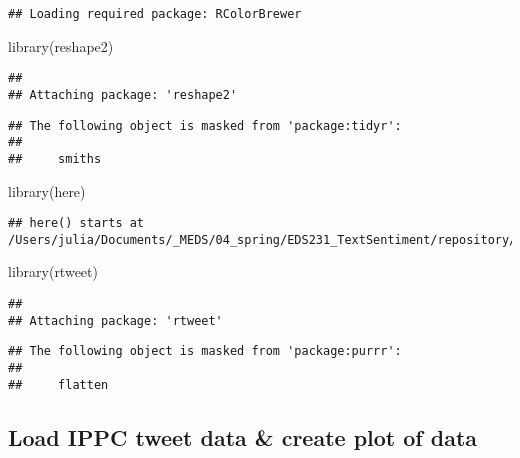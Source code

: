 \documentclass[
]{article}
\newenvironment{Shaded}{\begin{snugshade}}{\end{snugshade}}
\newcommand{\FunctionTok}[1]{\textcolor[rgb]{0.00,0.00,0.00}{#1}}
\newcommand{\NormalTok}[1]{#1}
\begin{document}
\begin{verbatim}
## Loading required package: RColorBrewer
\end{verbatim}

\begin{Shaded}
\begin{Highlighting}[]
\FunctionTok{library}\NormalTok{(reshape2)}
\end{Highlighting}
\end{Shaded}

\begin{verbatim}
## 
## Attaching package: 'reshape2'
\end{verbatim}

\begin{verbatim}
## The following object is masked from 'package:tidyr':
## 
##     smiths
\end{verbatim}

\begin{Shaded}
\begin{Highlighting}[]
\FunctionTok{library}\NormalTok{(here)}
\end{Highlighting}
\end{Shaded}

\begin{verbatim}
## here() starts at /Users/julia/Documents/_MEDS/04_spring/EDS231_TextSentiment/repository/EDS231_TextSentimentAnalysis
\end{verbatim}

\begin{Shaded}
\begin{Highlighting}[]
\FunctionTok{library}\NormalTok{(rtweet)}
\end{Highlighting}
\end{Shaded}

\begin{verbatim}
## 
## Attaching package: 'rtweet'
\end{verbatim}

\begin{verbatim}
## The following object is masked from 'package:purrr':
## 
##     flatten
\end{verbatim}

\hypertarget{load-ippc-tweet-data-create-plot-of-data}{%
\subsection{Load IPPC tweet data \& create plot of
data}\label{load-ippc-tweet-data-create-plot-of-data}}
\end{document}
